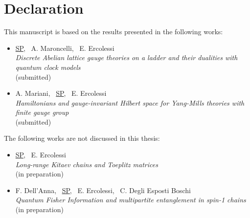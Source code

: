 \chapter*{Declaration}


This manuscript is based on the results presented in the following works:

\begin{itemize}
    \frenchspacing
    \item
        \underline{SP}, ~A. Maroncelli, ~E. Ercolessi\\
        \emph{Discrete Abelian lattice gauge theories on a ladder and their dualities with quantum clock models}\\
         (submitted)

    \item
        A. Mariani, ~\underline{SP}, ~E. Ercolessi\\
        \emph{Hamiltonians and gauge-invariant Hilbert space for Yang-Mills theories with finite gauge group }\\
         (submitted)
    \nonfrenchspacing
\end{itemize}

\vspace*{1cm}

\noindent The following works are not discussed in this thesis:

\begin{itemize}
    \frenchspacing
    \item
        \underline{SP}, ~E. Ercolessi\\
        \emph{Long-range Kitaev chains and Toeplitz matrices} \\
        (in preparation)

    \item
        F. Dell'Anna, ~\underline{SP}, ~E. Ercolessi, ~C. Degli Esposti Boschi\\
        \emph{Quantum Fisher Information and multipartite entanglement in spin-1 chains}\\
        (in preparation)

    \nonfrenchspacing
\end{itemize}

\cleardoublepage

